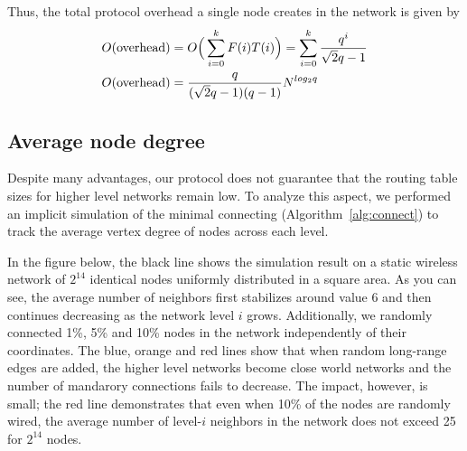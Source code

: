 \documentclass[conference]{IEEEtran}
\theoremstyle{definition}
\begin{document}
Thus, the total protocol overhead a single node creates in the network is given by
%
\begin{equation*}
\begin{split}
    O({\rm overhead}) & = O\Big( \sum_{i = 0}^{k} F(i)T(i) \Big) = \sum_{i = 0}^{k} \frac{q^i}{\sqrt{2}q - 1}   \\
    O({\rm overhead}) & = \frac{q}{ (\sqrt{2}q - 1)(q - 1) } N^{log_2q}
\end{split}
\end{equation*}
%
%


\subsection{Average node degree}
\label{sec:analysis:nodedegree}

Despite many advantages, our protocol does not guarantee that the routing table sizes for higher level networks remain low. To analyze this aspect, we performed an implicit simulation of the minimal connecting (Algorithm~\ref{alg:connect}) to track the average vertex degree of nodes across each level.

In the figure below, the black line shows the simulation result on a static wireless network of $2^{14}$ identical nodes uniformly distributed in a square area. As you can see, the average number of neighbors first stabilizes around value 6 and then continues decreasing as the network level $i$ grows. Additionally, we randomly connected 1\%, 5\% and 10\% nodes in the network independently of their coordinates. The blue, orange and red lines show that when random long-range edges are added, the higher level networks become close world networks and the number of mandarory connections fails to decrease. The impact, however, is small; the red line demonstrates that even when 10\% of the nodes are randomly wired, the average number of level-$i$ neighbors in the network does not exceed 25 for $2^{14}$ nodes.
\end{document}
